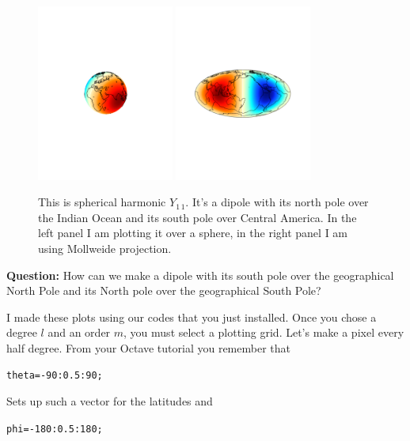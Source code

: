 \documentclass[11pt]{article}
\newcommand{\Yfun}{Y}
\begin{document}
\begin{figure}[ht!]
  \centering \includegraphics[width=0.4\textwidth,trim = 7cm 10cm 7cm
    10cm, clip]{figures/Y11} \includegraphics[width=0.4\textwidth,trim =
    3cm 9cm 3cm 10cm, clip]{figures/Y11_Mol}
  \caption{This is spherical harmonic $\Yfun_{1\,1}$. It's a dipole with
    its north pole over the Indian Ocean and its south pole over Central
    America. In the left panel I am plotting it over a sphere, in the
    right panel I am using Mollweide projection.}
  \label{Y11fig}
\end{figure}

\textbf{Question:} How can we make a dipole with its south pole over
the geographical North Pole and its North pole over the geographical
South Pole?


I made these plots using our codes that you just installed. Once you
chose a degree $l$ and an order $m$, you must select a plotting
grid. Let's make a pixel every half degree. From your Octave tutorial
you remember that

\qquad \verb+theta=-90:0.5:90;+

Sets up such a vector for the latitudes and 

\qquad \verb+phi=-180:0.5:180;+
\end{document}
